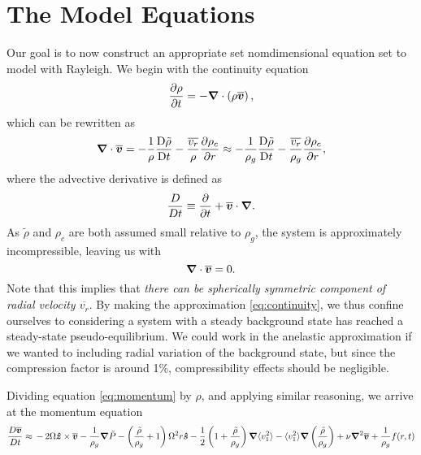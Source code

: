 \section{The Model Equations}
Our goal is to now construct an appropriate set nomdimensional equation set to model with Rayleigh.  We begin with the continuity equation
\begin{equation}
\frac{\partial \rho}{\partial t} = -\boldsymbol{\nabla}\cdot\left(\rho\overline{\boldsymbol{v}}\right),
\end{equation}
which can be rewritten as
\begin{equation}
\boldsymbol{\nabla}\cdot\overline{\boldsymbol{v}} =-\frac{1}{\rho}\frac{\mathrm{D}\tilde{\rho}}{\mathrm{D}t}-\frac{\overline{v_r}}{\rho}\frac{\partial \rho_c}{\partial r} \approx -\frac{1}{\rho_g}\frac{\mathrm{D}\tilde{\rho}}{\mathrm{D}t}-\frac{\overline{v_r}}{\rho_g}\frac{\partial \rho_c}{\partial r},
\end{equation}
where the advective derivative is defined as
\begin{equation}
\frac{D}{Dt}\equiv\frac{\partial}{\partial t} + \overline{\boldsymbol{v}}\cdot\boldsymbol{\nabla}.
\end{equation}
As $\tilde{\rho}$ and $\rho_c$ are both assumed small relative to $\rho_g$, the system is approximately incompressible, leaving us with
\begin{equation}
\label{eq:continuity}
\boldsymbol{\nabla}\cdot\overline{\boldsymbol{v}} = 0.
\end{equation}
Note that this implies that {\em there can be spherically symmetric component of radial velocity $\overline{v_r}$}.  By making the approximation \ref{eq:continuity}, we thus confine ourselves to considering a system with a steady background state has reached a steady-state pseudo-equilibrium.   We could work in the anelastic approximation if we wanted to including radial variation of the background state, but since the compression factor is around 1\%,  compressibility effects should be negligible.

Dividing equation \ref{eq:momentum} by $\rho$, and applying similar reasoning, we arrive at the momentum equation
\begin{equation}
\label{eq:momnew}
\frac{ D \vvecbar }{D t}   \approx  
\,-\, 2\Omega\boldsymbol{\hat{z}}\times\vvecbar 
-\frac{1}{\rho_g}\boldsymbol{\nabla}\tilde{P}  %
-\left(\frac{\tilde{\rho}}{\rho_g}+1\right)\Omega^2r\boldsymbol{\hat{s}}
						        - \frac{1}{2}\left( 1 + \frac{\tilde{\rho}}{\rho_g}\right)\boldsymbol{\nabla}\langle v_1^2\rangle
							- \langle v_1^2\rangle\boldsymbol{\nabla}\left(\frac{\tilde{\rho}}{\rho_g}\right)
+ \nu\boldsymbol{\nabla}^2\vvecbar
+\frac{1}{\rho_g}f(r,t)
\end{equation}

